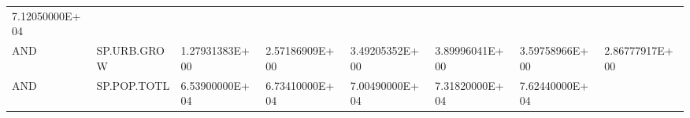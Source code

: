 \documentclass[]{article}
\begin{document}
\begin{longtable}[]{@{}llllllll@{}}
\begin{minipage}[t]{0.11\columnwidth}
7.12050000E+04\strut
\end{minipage}\tabularnewline
\begin{minipage}[t]{0.06\columnwidth}\raggedright
AND\strut
\end{minipage} & \begin{minipage}[t]{0.08\columnwidth}\raggedright
SP.URB.GROW\strut
\end{minipage} & \begin{minipage}[t]{0.11\columnwidth}\raggedright
1.27931383E+00\strut
\end{minipage} & \begin{minipage}[t]{0.11\columnwidth}\raggedright
2.57186909E+00\strut
\end{minipage} & \begin{minipage}[t]{0.11\columnwidth}\raggedright
3.49205352E+00\strut
\end{minipage} & \begin{minipage}[t]{0.11\columnwidth}\raggedright
3.89996041E+00\strut
\end{minipage} & \begin{minipage}[t]{0.11\columnwidth}\raggedright
3.59758966E+00\strut
\end{minipage} & \begin{minipage}[t]{0.11\columnwidth}\raggedright
2.86777917E+00\strut
\end{minipage}\tabularnewline
\begin{minipage}[t]{0.06\columnwidth}\raggedright
AND\strut
\end{minipage} & \begin{minipage}[t]{0.08\columnwidth}\raggedright
SP.POP.TOTL\strut
\end{minipage} & \begin{minipage}[t]{0.11\columnwidth}\raggedright
6.53900000E+04\strut
\end{minipage} & \begin{minipage}[t]{0.11\columnwidth}\raggedright
6.73410000E+04\strut
\end{minipage} & \begin{minipage}[t]{0.11\columnwidth}\raggedright
7.00490000E+04\strut
\end{minipage} & \begin{minipage}[t]{0.11\columnwidth}\raggedright
7.31820000E+04\strut
\end{minipage} & \begin{minipage}[t]{0.11\columnwidth}\raggedright
7.62440000E+04\strut
\end{minipage} & \begin{minipage}[t]{0.11\columnwidth}\raggedright

\end{minipage}
\end{longtable}
\end{document}
